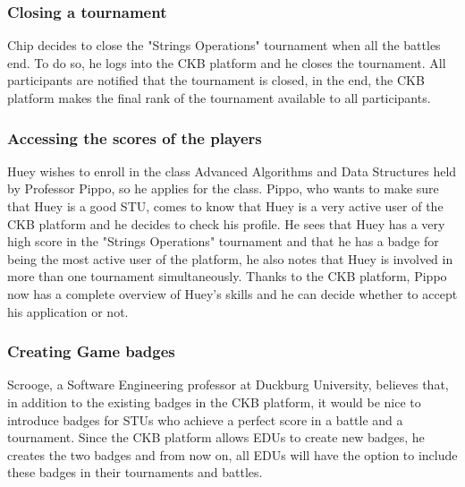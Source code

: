 \subsubsection{Closing a tournament}
Chip decides to close the "Strings Operations" tournament when all the battles end.
To do so, he logs into the CKB platform and he closes the tournament.
All participants are notified that the tournament is closed, in the end, the CKB platform makes the final rank of the tournament available to all participants.

\subsubsection{Accessing the scores of the players}
Huey wishes to enroll in the class Advanced Algorithms and Data Structures held by Professor Pippo, so he applies for the class.
Pippo, who wants to make sure that Huey is a good STU, comes to know that Huey is a very active user of the CKB platform and he decides to check his profile.
He sees that Huey has a very high score in the "Strings Operations" tournament and that he has a badge for being the most active user of the platform, he also notes that Huey is involved in more than one tournament simultaneously.
Thanks to the CKB platform, Pippo now has a complete overview of Huey's skills and he can decide whether to accept his application or not.

\subsubsection{Creating Game badges}
Scrooge, a Software Engineering professor at Duckburg University, believes that, in addition to the existing badges in the CKB platform, it would be nice to introduce badges for STUs who achieve a perfect score in a battle and a tournament.
Since the CKB platform allows EDUs to create new badges, he creates the two badges and from now on, all EDUs will have the option to include these badges in their tournaments and battles.

